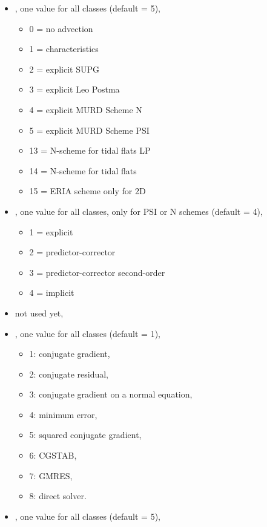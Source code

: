 \begin{itemize}
  \item {}, one value for all classes (default = 5),
    \begin{itemize}
      \item 0 = no advection
      \item 1 = characteristics
      \item 2 = explicit SUPG
      \item 3 = explicit Leo Postma
      \item 4 = explicit MURD Scheme N
      \item 5 = explicit MURD Scheme PSI
      \item 13 = N-scheme for tidal flats LP
      \item 14 = N-scheme for tidal flats
      \item 15 = ERIA scheme only for 2D
    \end{itemize}
  \item {}, one value for all classes, only for PSI or N schemes (default = 4),
    \begin{itemize}
      \item 1 = explicit
      \item 2 = predictor-corrector
      \item 3 = predictor-corrector second-order
      \item 4 = implicit
    \end{itemize}
  \item {} not used yet, %
  \item {}, one value for all classes (default = 1),
    \begin{itemize}
      \item 1: conjugate gradient,
      \item 2: conjugate residual,
      \item 3: conjugate gradient on a normal equation,
      \item 4: minimum error,
      \item 5: squared conjugate gradient,
      \item 6: CGSTAB,
      \item 7: GMRES,
      \item 8: direct solver.
    \end{itemize}
  \item {}, one value for all classes (default = 5),

\end{itemize}
